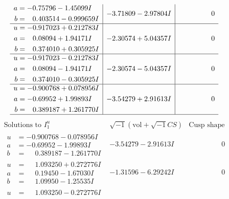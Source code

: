 \documentclass[1p]{elsarticle_modified}
\theoremstyle{definition}
\newcommand{\I}{\sqrt{-1}}
\begin{document}
$$\begin{array}{c|c|c}
\begin{aligned}
a &= -0.75796 - 1.45099 I \\
b &= \phantom{-}0.403514 - 0.999659 I\end{aligned}
 & -3.71809 - 2.97804 I & \phantom{-0.000000 } 0 \\ \hline\begin{aligned}
u &= -0.917023 + 0.212783 I \\
a &= \phantom{-}0.08094 + 1.94171 I \\
b &= \phantom{-}0.374010 + 0.305925 I\end{aligned}
 & -2.30574 + 5.04357 I & \phantom{-0.000000 } 0 \\ \hline\begin{aligned}
u &= -0.917023 - 0.212783 I \\
a &= \phantom{-}0.08094 - 1.94171 I \\
b &= \phantom{-}0.374010 - 0.305925 I\end{aligned}
 & -2.30574 - 5.04357 I & \phantom{-0.000000 } 0 \\ \hline\begin{aligned}
u &= -0.900768 + 0.078956 I \\
a &= -0.69952 + 1.99893 I \\
b &= \phantom{-}0.389187 + 1.261770 I\end{aligned}
 & -3.54279 + 2.91613 I & \phantom{-0.000000 } 0\\
 \hline 
 \end{array}$$\newpage$$\begin{array}{c|c|c}  
\text{Solutions to }I^u_{1}& \I (\text{vol} + \sqrt{-1}CS) & \text{Cusp shape}\\
 \hline 
\begin{aligned}
u &= -0.900768 - 0.078956 I \\
a &= -0.69952 - 1.99893 I \\
b &= \phantom{-}0.389187 - 1.261770 I\end{aligned}
 & -3.54279 - 2.91613 I & \phantom{-0.000000 } 0 \\ \hline\begin{aligned}
u &= \phantom{-}1.093250 + 0.272776 I \\
a &= \phantom{-}0.19450 - 1.67030 I \\
b &= \phantom{-}1.09950 - 1.25535 I\end{aligned}
 & -1.31596 - 6.29242 I & \phantom{-0.000000 } 0 \\ \hline\begin{aligned}
u &= \phantom{-}1.093250 - 0.272776 I \\

\end{aligned}
\end{array}$$
\end{document}
